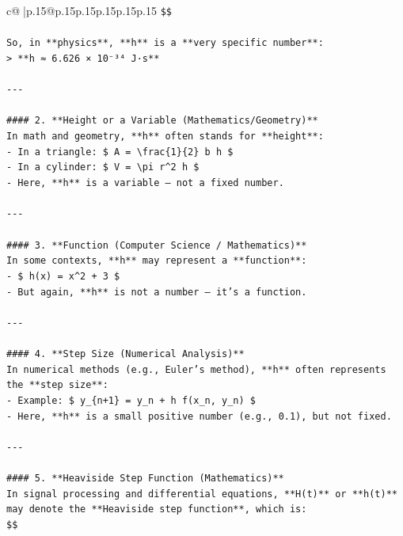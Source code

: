 \documentclass{article}
\begin{document}
{\begin{supertabular}{c@{$\;$}|p{.15\linewidth}@{}p{.15\linewidth}p{.15\linewidth}p{.15\linewidth}p{.15\linewidth}p{.15\linewidth}}
{{{\texttt{\$\$} \\
\\ 
\texttt{So, in **physics**, **h** is a **very specific number**:} \\
\texttt{> **h ≈ 6.626 × 10⁻³⁴ J·s**} \\
\\ 
\texttt{{-}{-}{-}} \\
\\ 
\texttt{\#\#\#\# 2. **Height or a Variable (Mathematics/Geometry)**} \\
\texttt{In math and geometry, **h** often stands for **height**:} \\
\texttt{{-} In a triangle: \$ A = \textbackslash{}frac\{1\}\{2\} b h \$} \\
\texttt{{-} In a cylinder: \$ V = \textbackslash{}pi r\^{}2 h \$} \\
\texttt{{-} Here, **h** is a variable — not a fixed number.} \\
\\ 
\texttt{{-}{-}{-}} \\
\\ 
\texttt{\#\#\#\# 3. **Function (Computer Science / Mathematics)**} \\
\texttt{In some contexts, **h** may represent a **function**:} \\
\texttt{{-} \$ h(x) = x\^{}2 + 3 \$} \\
\texttt{{-} But again, **h** is not a number — it's a function.} \\
\\ 
\texttt{{-}{-}{-}} \\
\\ 
\texttt{\#\#\#\# 4. **Step Size (Numerical Analysis)**} \\
\texttt{In numerical methods (e.g., Euler's method), **h** often represents the **step size**:} \\
\texttt{{-} Example: \$ y\_\{n+1\} = y\_n + h f(x\_n, y\_n) \$} \\
\texttt{{-} Here, **h** is a small positive number (e.g., 0.1), but not fixed.} \\
\\ 
\texttt{{-}{-}{-}} \\
\\ 
\texttt{\#\#\#\# 5. **Heaviside Step Function (Mathematics)**} \\
\texttt{In signal processing and differential equations, **H(t)** or **h(t)** may denote the **Heaviside step function**, which is:} \\
\texttt{\$\$} \\
}}}
\end{supertabular}}
\end{document}
